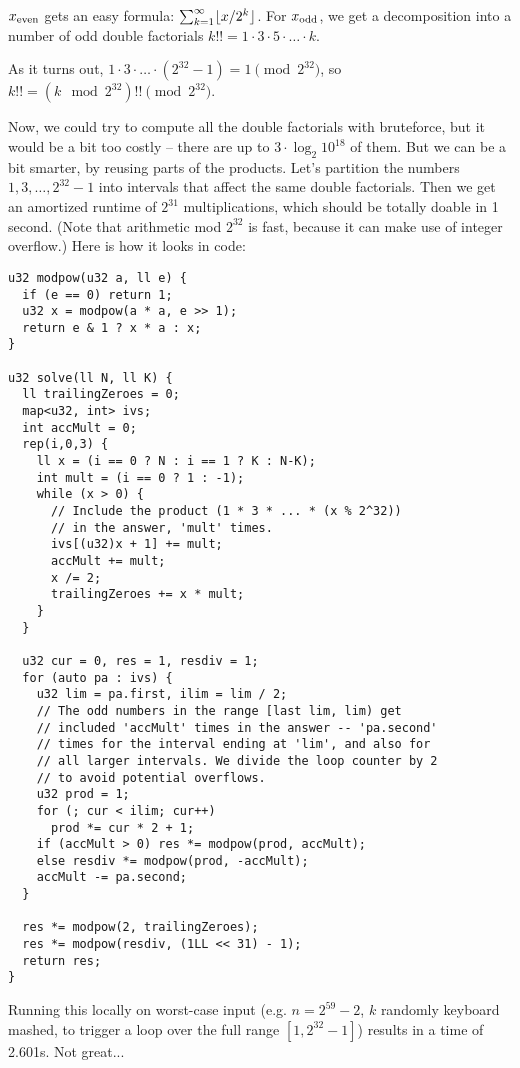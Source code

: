 \medskip

$x_\text{even}$ gets an easy formula: $\sum_{k=1}^\infty \lfloor x / 2^k\rfloor$.
For $x_\text{odd}$, we get a decomposition into a number of odd double factorials $k!! = 1 \cdot 3 \cdot 5 \cdot \ldots \cdot k$.

As it turns out, $1 \cdot 3 \cdot \ldots \cdot (2^{32}-1) = 1 \pmod{2^{32}}$, so $k!! = (k \mod 2^{32})!! \pmod{2^{32}}$.

Now, we could try to compute all the double factorials with bruteforce, but it would be a bit too costly -- there are up to $3 \cdot \log_2{10^{18}}$ of them.
But we can be a bit smarter, by reusing parts of the products.
Let's partition the numbers $1, 3, \dots, 2^{32}-1$ into intervals that affect the same double factorials.
Then we get an amortized runtime of $2^{31}$ multiplications, which should be totally doable in 1 second.
(Note that arithmetic mod $2^{32}$ is fast, because it can make use of integer overflow.)
Here is how it looks in code:

\begin{lstlisting}
u32 modpow(u32 a, ll e) {
  if (e == 0) return 1;
  u32 x = modpow(a * a, e >> 1);
  return e & 1 ? x * a : x;
}

u32 solve(ll N, ll K) {
  ll trailingZeroes = 0;
  map<u32, int> ivs;
  int accMult = 0;
  rep(i,0,3) {
    ll x = (i == 0 ? N : i == 1 ? K : N-K);
    int mult = (i == 0 ? 1 : -1);
    while (x > 0) {
      // Include the product (1 * 3 * ... * (x % 2^32))
      // in the answer, 'mult' times.
      ivs[(u32)x + 1] += mult;
      accMult += mult;
      x /= 2;
      trailingZeroes += x * mult;
    }
  }

  u32 cur = 0, res = 1, resdiv = 1;
  for (auto pa : ivs) {
    u32 lim = pa.first, ilim = lim / 2;
    // The odd numbers in the range [last lim, lim) get
    // included 'accMult' times in the answer -- 'pa.second'
    // times for the interval ending at 'lim', and also for
    // all larger intervals. We divide the loop counter by 2
    // to avoid potential overflows.
    u32 prod = 1;
    for (; cur < ilim; cur++)
      prod *= cur * 2 + 1;
    if (accMult > 0) res *= modpow(prod, accMult);
    else resdiv *= modpow(prod, -accMult);
    accMult -= pa.second;
  }

  res *= modpow(2, trailingZeroes);
  res *= modpow(resdiv, (1LL << 31) - 1);
  return res;
}
\end{lstlisting}

Running this locally on worst-case input (e.g. $n = 2^{59}-2$, $k$ randomly keyboard mashed, to trigger a loop over the full range $[1, 2^{32}-1]$) results in a time of 2.601s. Not great...

